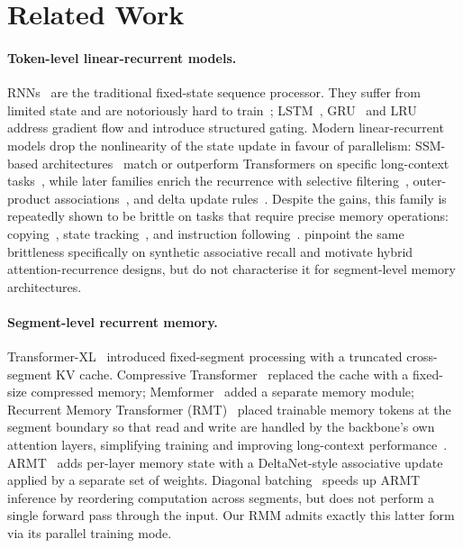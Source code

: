\documentclass[11pt]{article}
\begin{document}
\section{Related Work}

\paragraph{Token-level linear-recurrent models.}
RNNs~\citep{elman1990finding} are the traditional fixed-state sequence processor. They suffer from limited state and are notoriously hard to train~\citep{pascanu2013difficulty}; LSTM~\citep{hochreiter1997lstm}, GRU~\citep{cho2014gru} and LRU~\citep{orvieto2023lru} address gradient flow and introduce structured gating. Modern linear-recurrent models drop the nonlinearity of the state update in favour of parallelism: SSM-based architectures~\citep{gu2020hippo, gu2022s4} match or outperform Transformers on specific long-context tasks~\citep{tay2021lra}, while later families enrich the recurrence with selective filtering~\citep{gu2023mamba, dao2024mamba2}, outer-product associations~\citep{schlag2021linear, sun2023retnet}, and delta update rules~\citep{schlag2021linear, yang2024deltanet, yang2024gateddeltanet}. Despite the gains, this family is repeatedly shown to be brittle on tasks that require precise memory operations: copying~\citep{jelassi2024repeat}, state tracking~\citep{merrill2024statetracking}, and instruction following~\citep{park2024canmambalearn}. \citet{arora2023zoology, arora2024just} pinpoint the same brittleness specifically on synthetic associative recall and motivate hybrid attention-recurrence designs, but do not characterise it for segment-level memory architectures.

\paragraph{Segment-level recurrent memory.}
Transformer-XL~\citep{dai2019trxl} introduced fixed-segment processing with a truncated cross-segment KV cache. Compressive Transformer~\citep{rae2019compressive} replaced the cache with a fixed-size compressed memory; Memformer~\citep{wu2020memformer} added a separate memory module; Recurrent Memory Transformer (RMT)~\citep{bulatov2022rmt} placed trainable memory tokens at the segment boundary so that read and write are handled by the backbone's own attention layers, simplifying training and improving long-context performance~\citep{kuratov2024babilong}. ARMT~\citep{rodkin2024armt} adds per-layer memory state with a DeltaNet-style associative update applied by a separate set of weights. Diagonal batching~\citep{kuzmin2026extending} speeds up ARMT inference by reordering computation across segments, but does not perform a single forward pass through the input. Our RMM admits exactly this latter form via its parallel training mode.
\end{document}
